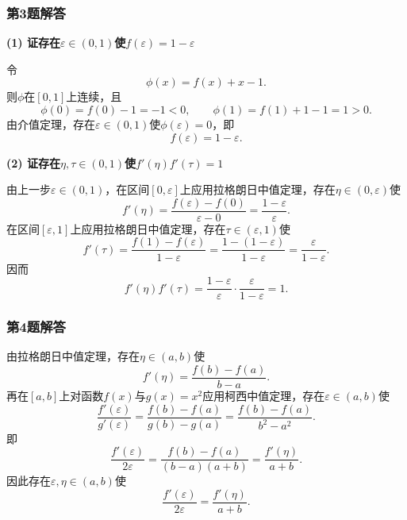 \documentclass[./book.tex]{subfiles}
\begin{document}
    \subsubsection*{第3题解答}
    \begin{analysisbox}
        \textbf{(1) 证存在$\varepsilon\in(0,1)$使$f(\varepsilon)=1-\varepsilon$}

        令
        \[
            \phi(x)=f(x)+x-1.
        \]
        则$\phi$在$[0,1]$上连续，且
        \[
            \phi(0)=f(0)-1=-1<0,\qquad
            \phi(1)=f(1)+1-1=1>0.
        \]
        由介值定理，存在$\varepsilon\in(0,1)$使$\phi(\varepsilon)=0$，即
        \[
            f(\varepsilon)=1-\varepsilon.
        \]

        \textbf{(2) 证存在$\eta,\tau\in(0,1)$使$f'(\eta)f'(\tau)=1$}

        由上一步$\varepsilon\in(0,1)$，在区间$[0,\varepsilon]$上应用拉格朗日中值定理，存在$\eta\in(0,\varepsilon)$使
        \[
            f'(\eta)=\frac{f(\varepsilon)-f(0)}{\varepsilon-0}
            =\frac{1-\varepsilon}{\varepsilon}.
        \]
        在区间$[\varepsilon,1]$上应用拉格朗日中值定理，存在$\tau\in(\varepsilon,1)$使
        \[
            f'(\tau)=\frac{f(1)-f(\varepsilon)}{1-\varepsilon}
            =\frac{1-(1-\varepsilon)}{1-\varepsilon}
            =\frac{\varepsilon}{1-\varepsilon}.
        \]
        因而
        \[
            f'(\eta)f'(\tau)
            =\frac{1-\varepsilon}{\varepsilon}\cdot\frac{\varepsilon}{1-\varepsilon}
            =1.
        \]
    \end{analysisbox}

    \subsubsection*{第4题解答}
    \begin{analysisbox}
        由拉格朗日中值定理，存在$\eta\in(a,b)$使
        \[
            f'(\eta)=\frac{f(b)-f(a)}{b-a}.
        \]
        再在$[a,b]$上对函数$f(x)$与$g(x)=x^2$应用柯西中值定理，存在$\varepsilon\in(a,b)$使
        \[
            \frac{f'(\varepsilon)}{g'(\varepsilon)}
            =\frac{f(b)-f(a)}{g(b)-g(a)}
            =\frac{f(b)-f(a)}{b^2-a^2}.
        \]
        即
        \[
            \frac{f'(\varepsilon)}{2\varepsilon}
            =\frac{f(b)-f(a)}{(b-a)(a+b)}
            =\frac{f'(\eta)}{a+b}.
        \]
        因此存在$\varepsilon,\eta\in(a,b)$使
        \[
            \boxed{\frac{f'(\varepsilon)}{2\varepsilon}=\frac{f'(\eta)}{a+b}}.
        \]
    \end{analysisbox}
\end{document}

